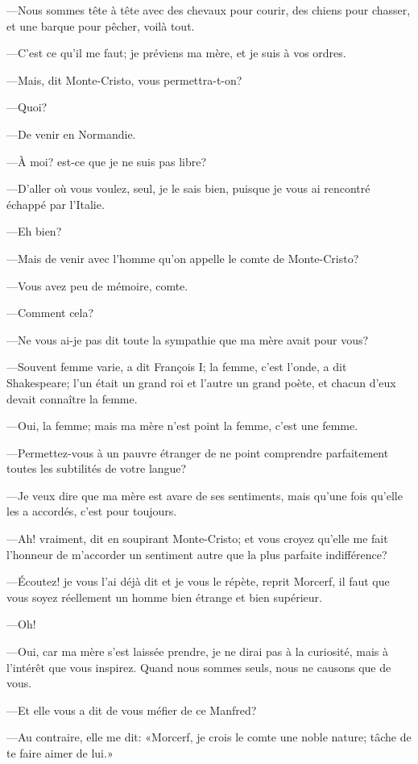 —Nous sommes tête à tête avec des chevaux pour courir, des chiens pour chasser, et une barque pour pêcher, voilà tout. 

—C'est ce qu'il me faut; je préviens ma mère, et je suis à vos ordres. 

—Mais, dit Monte-Cristo, vous permettra-t-on? 

—Quoi? 

—De venir en Normandie. 

—À moi? est-ce que je ne suis pas libre? 

—D'aller où vous voulez, seul, je le sais bien, puisque je vous ai rencontré échappé par l'Italie. 

—Eh bien? 

—Mais de venir avec l'homme qu'on appelle le comte de Monte-Cristo? 

—Vous avez peu de mémoire, comte. 

—Comment cela? 

—Ne vous ai-je pas dit toute la sympathie que ma mère avait pour vous? 

—Souvent femme varie, a dit François I\ier; la femme, c'est l'onde, a dit Shakespeare; l'un était un grand roi et l'autre un grand poète, et chacun d'eux devait connaître la femme. 

—Oui, la femme; mais ma mère n'est point la femme, c'est une femme. 

—Permettez-vous à un pauvre étranger de ne point comprendre parfaitement toutes les subtilités de votre langue? 

—Je veux dire que ma mère est avare de ses sentiments, mais qu'une fois qu'elle les a accordés, c'est pour toujours. 

—Ah! vraiment, dit en soupirant Monte-Cristo; et vous croyez qu'elle me fait l'honneur de m'accorder un sentiment autre que la plus parfaite indifférence? 

—Écoutez! je vous l'ai déjà dit et je vous le répète, reprit Morcerf, il faut que vous soyez réellement un homme bien étrange et bien supérieur. 

—Oh! 

—Oui, car ma mère s'est laissée prendre, je ne dirai pas à la curiosité, mais à l'intérêt que vous inspirez. Quand nous sommes seuls, nous ne causons que de vous. 

—Et elle vous a dit de vous méfier de ce Manfred? 

—Au contraire, elle me dit: «Morcerf, je crois le comte une noble nature; tâche de te faire aimer de lui.» 

